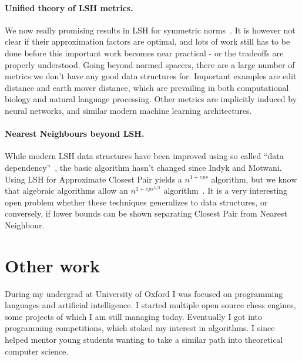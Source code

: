 \documentclass[10pt]{article}
\begin{document}
\paragraph{Unified theory of LSH metrics.}
We now really promising results in LSH for symmetric norms~\cite{DBLP:journals/siamcomp/AndoniKR18}.
It is however not clear if their approximation factors are optimal, and lots of work still has to be done before this important work becomes near practical - or the tradeoffs are properly understood.
Going beyond normed spacers, there are a large number of metrics we don’t have any good data structures for.
Important examples are edit distance and earth mover distance, which are prevailing in both computational biology and natural language processing.
Other metrics are implicitly induced by neural networks, and similar modern machine learning architectures.

\paragraph{Nearest Neighbours beyond LSH.}
While modern LSH data structures have been improved using so called ``data dependency''~\cite{DBLP:journals/corr/AndoniR15, DBLP:conf/stoc/AndoniNNRW18}, the basic algorithm hasn’t changed since Indyk and Motwani.
Using LSH for Approximate Closest Pair yields a $n^{1+eps}$ algorithm, but we know that algebraic algorithms allow an $n^{1+eps^{1/3}}$ algorithm~\cite{DBLP:journals/corr/AlmanCW16}.
It is a very interesting open problem whether these techniques generalizes to data structures, or conversely, if lower bounds can be shown separating Closest Pair from Nearest Neighbour.

\section{Other work}

During my undergrad at University of Oxford I was focused on programming languages and artificial intelligence.
I started multiple open source chess engines, some projects of which I am still managing today.
Eventually I got into programming competitions, which stoked my interest in algorithms.
I since helped mentor young students wanting to take a similar path into theoretical computer science.



\end{document}
